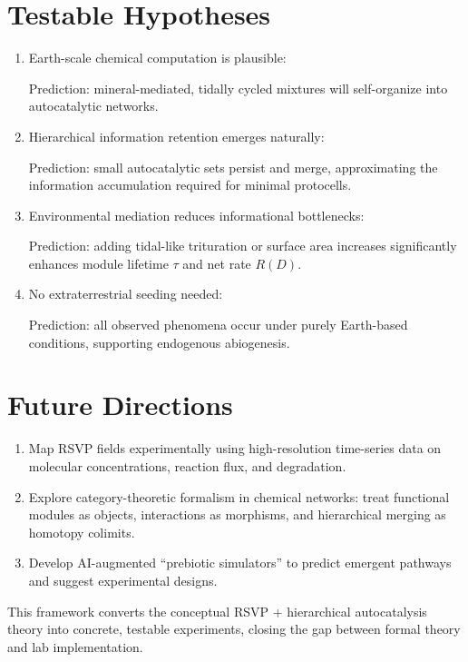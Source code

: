 \documentclass{book}
\begin{document}
\section{Testable Hypotheses}
\begin{enumerate}
\item Earth-scale chemical computation is plausible:

Prediction: mineral-mediated, tidally cycled mixtures will self-organize into autocatalytic networks.

\item Hierarchical information retention emerges naturally:

Prediction: small autocatalytic sets persist and merge, approximating the information accumulation required for minimal protocells.

\item Environmental mediation reduces informational bottlenecks:

Prediction: adding tidal-like trituration or surface area increases significantly enhances module lifetime $\tau$ and net rate $R(D)$.

\item No extraterrestrial seeding needed:

Prediction: all observed phenomena occur under purely Earth-based conditions, supporting endogenous abiogenesis.
\end{enumerate}

\section{Future Directions}
\begin{enumerate}
\item Map RSVP fields experimentally using high-resolution time-series data on molecular concentrations, reaction flux, and degradation.
\item Explore category-theoretic formalism in chemical networks: treat functional modules as objects, interactions as morphisms, and hierarchical merging as homotopy colimits.
\item Develop AI-augmented “prebiotic simulators” to predict emergent pathways and suggest experimental designs.
\end{enumerate}

This framework converts the conceptual RSVP + hierarchical autocatalysis theory into concrete, testable experiments, closing the gap between formal theory and lab implementation.
\end{document}
